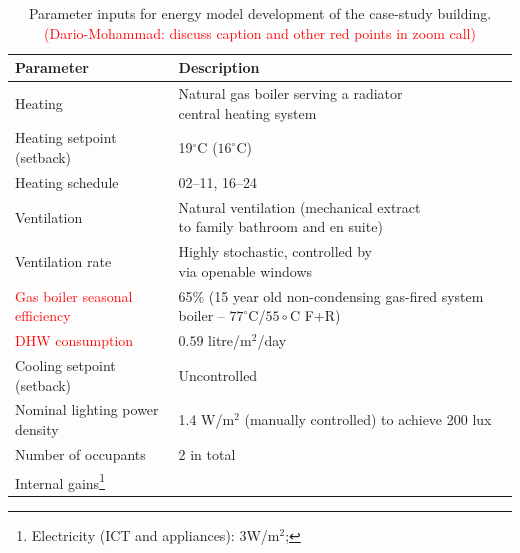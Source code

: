\documentclass[preprint,12pt, sort&compress]{elsarticle}
\newcommand{\red}[1]{\textcolor{red}{#1}}
\begin{document}
\begin{table}
\centering
\renewcommand{\arraystretch}{1.4}
\caption{Parameter inputs for energy model development of the case-study building. \textcolor{red}{(Dario-Mohammad: discuss caption and other red points in zoom call)}}
\label{Table_all_params}
\begin{tabular}{ll}
\toprule
{\bf Parameter} & {\bf Description} \\
\midrule
Heating                                                  & \makecell[l]{Natural gas boiler serving a radiator\\
                                                                                              central heating system} \\
Heating setpoint (setback)               &19$^\circ$C ($16^\circ$C)\\
Heating schedule                                & 02--11, 16--24\\
Ventilation                                            & \makecell[l]{Natural ventilation (mechanical extract \\
                                                                                              to family bathroom and en suite)}\\
Ventilation rate                                   & \makecell[l]{Highly stochastic, controlled by \\
                                                                                             via openable windows}\\
\red{Gas boiler  
seasonal efficiency}                           & \makecell[l]{65\% (15 year old non-condensing gas-fired \\
                                                                                             system boiler -- $77^\circ$C/$55\circ$C F+R)}\\
\red{DHW consumption}                 & $0.59$ litre/m$^2$/day \\
Cooling setpoint (setback)               & Uncontrolled \\
Nominal lighting power density     & \makecell[l]{1.4 W/m$^2$ (manually controlled) \\
                                                                                              to achieve 200 lux} \\
Number of occupants                        & 2 in total\\
Internal gains\footnote{Electricity (ICT and appliances): 3W/m$^2$; 
}
\end{tabular}
\end{table}
\end{document}
